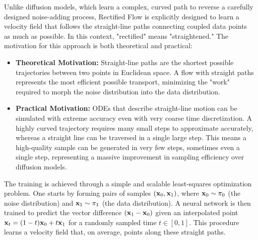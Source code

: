 Unlike diffusion models, which learn a complex, curved path to reverse a carefully designed noise-adding process, Rectified Flow is explicitly designed to learn a velocity field that follows the straight-line paths connecting coupled data points as much as possible. In this context, "rectified" means "straightened." The motivation for this approach is both theoretical and practical:
\begin{itemize}
    \item \textbf{Theoretical Motivation:} Straight-line paths are the shortest possible trajectories between two points in Euclidean space. A flow with straight paths represents the most efficient possible transport, minimizing the "work" required to morph the noise distribution into the data distribution.
    \item \textbf{Practical Motivation:} ODEs that describe straight-line motion can be simulated with extreme accuracy even with very coarse time discretization. A highly curved trajectory requires many small steps to approximate accurately, whereas a straight line can be traversed in a single large step. This means a high-quality sample can be generated in very few steps, sometimes even a single step, representing a massive improvement in sampling efficiency over diffusion models.
\end{itemize}

The training is achieved through a simple and scalable least-squares optimization problem. One starts by forming pairs of samples $(\mathbf{x}_0, \mathbf{x}_1)$, where $\mathbf{x}_0 \sim \pi_0$ (the noise distribution) and $\mathbf{x}_1 \sim \pi_1$ (the data distribution). A neural network is then trained to predict the vector difference $(\mathbf{x}_1 - \mathbf{x}_0)$ given an interpolated point $\mathbf{x}_t = (1-t)\mathbf{x}_0 + t \mathbf{x}_1$ for a randomly sampled time $t \in [0, 1]$. This procedure learns a velocity field that, on average, points along these straight paths.

